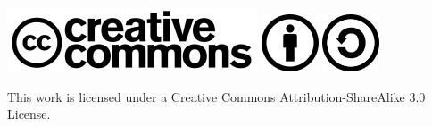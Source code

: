 \vspace{250pt}


\begin{center}
	\includegraphics[scale=0.5]{../pictures/280px-CreativeCommond_logo_trademark.png}
	\includegraphics[scale=0.5]{../pictures/64px-Cc-by_new.png}
	\includegraphics[scale=0.5]{../pictures/64px-Cc-sa_white.png}
\end{center}
\begin{center}This work is licensed under a Creative Commons Attribution-ShareAlike 3.0 License.\end{center}


